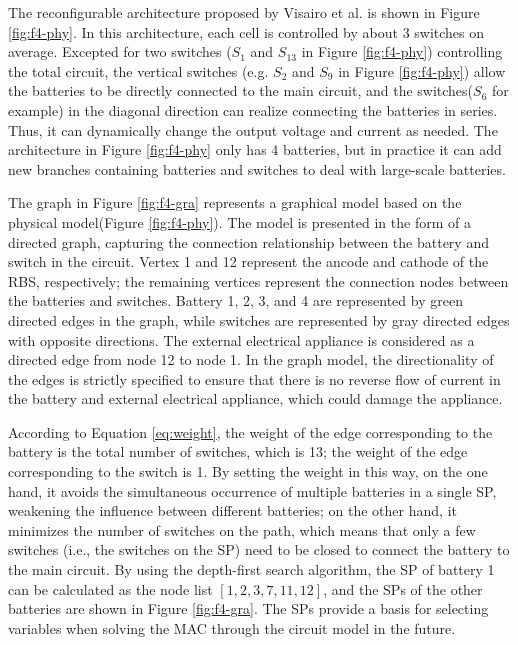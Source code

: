 \documentclass{article}
\begin{document}
The reconfigurable architecture proposed by Visairo et al.\cite{visairoReconfigurableBatteryPack2008} is shown in Figure \ref{fig:f4-phy}.
In this architecture, each cell is controlled by about 3 switches on average.
Excepted for two switches ($S_1$ and $S_{13}$ in Figure \ref{fig:f4-phy}) controlling the total circuit, the vertical switches (e.g. $S_2$ and $S_9$ in Figure \ref{fig:f4-phy}) allow the batteries to be directly connected to the main circuit, and the switches($S_6$ for example) in the diagonal direction can realize connecting the batteries in series.
Thus, it can dynamically change the output voltage and current as needed.
The architecture in Figure \ref{fig:f4-phy} only has 4 batteries, but in practice it can add new branches containing batteries and switches to deal with large-scale batteries\cite{kimDependableEfficientScalable2010}.


The graph in Figure \ref{fig:f4-gra} represents a graphical model based on the physical model(Figure \ref{fig:f4-phy}).
The model is presented in the form of a directed graph, capturing the connection relationship between the battery and switch in the circuit.
Vertex 1 and 12 represent the ancode and cathode of the RBS, respectively;
the remaining vertices represent the connection nodes between the batteries and switches.
Battery 1, 2, 3, and 4 are represented by green directed edges in the graph, while switches are represented by gray directed edges with opposite directions.
The external electrical appliance is considered as a directed edge from node 12 to node 1.
In the graph model, the directionality of the edges is strictly specified to ensure that there is no reverse flow of current in the battery and external electrical appliance, which could damage the appliance.


According to Equation \ref{eq:weight}, the weight of the edge corresponding to the battery is the total number of switches, which is 13;
the weight of the edge corresponding to the switch is 1.
By setting the weight in this way, on the one hand, it avoids the simultaneous occurrence of multiple batteries in a single SP, weakening the influence between different batteries;
on the other hand, it minimizes the number of switches on the path, which means that only a few switches (i.e., the switches on the SP) need to be closed to connect the battery to the main circuit.
By using the depth-first search algorithm, the SP of battery 1 can be calculated as the node list $[1, 2, 3, 7, 11, 12]$, and the SPs of the other batteries are shown in Figure \ref{fig:f4-gra}.
The SPs provide a basis for selecting variables when solving the MAC through the circuit model in the future.
\end{document}
